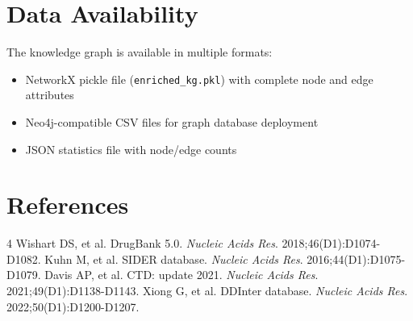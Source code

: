 \documentclass[11pt,a4paper]{article}
\begin{document}
\section*{Data Availability}

The knowledge graph is available in multiple formats:
\begin{itemize}
    \item NetworkX pickle file (\texttt{enriched\_kg.pkl}) with complete node and edge attributes
    \item Neo4j-compatible CSV files for graph database deployment
    \item JSON statistics file with node/edge counts
\end{itemize}

\section*{References}

\begin{thebibliography}{4}
 Wishart DS, et al. DrugBank 5.0. \textit{Nucleic Acids Res}. 2018;46(D1):D1074-D1082.
 Kuhn M, et al. SIDER database. \textit{Nucleic Acids Res}. 2016;44(D1):D1075-D1079.
 Davis AP, et al. CTD: update 2021. \textit{Nucleic Acids Res}. 2021;49(D1):D1138-D1143.
 Xiong G, et al. DDInter database. \textit{Nucleic Acids Res}. 2022;50(D1):D1200-D1207.
\end{thebibliography}
\end{document}
